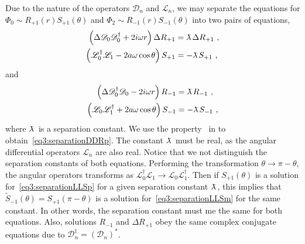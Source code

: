 Due to the nature of the operators $\mathscr{D}_n$ and $\mathscr{L}_n$, we may separate the equations for $\Phi_0 \sim R_{+1}(r) S_{+1}(\theta)$ and $\Phi_2 \sim R_{-1}(r) S_{-1}(\theta)$ into two pairs of equations, 
\begin{subequations}
    \label{eq3:separationRSp}
    \begin{align}
        \label{eq3:separationDDRp}
        \left(\Delta \mathscr{D}_0 \mathscr{D}^\dagger_0 + 2 i \omega r \right) \Delta R_{+1} 
        &= \lambdabar \Delta R_{+1} ~, \\
        \label{eq3:separationLLSp}
        \left( \mathscr{L}^\dagger_0 \mathscr{L}_1 - 2 a \omega \cos\theta \right) S_{+1}
        &= - \lambdabar S_{+1}  ~, 
    \end{align}
\end{subequations}
and
\begin{subequations}
    \label{eq3:separationRSm}
    \begin{align}
        \label{eq3:separationDDRm}
        \left( \Delta \mathscr{D}^\dagger_0 \mathscr{D}_0 - 2 i \omega r \right) R_{-1}
        &= \lambdabar R_{-1} ~, \\
        \label{eq3:separationLLSm}
        \left( \mathscr{L}_0 \mathscr{L}^\dagger_1 + 2 a \omega \cos\theta \right) S_{-1}
        &= - \lambdabar S_{-1}  ~,
    \end{align}
\end{subequations}
where $\lambdabar$ is a separation constant.
We use the property~ in to obtain~\eqref{eq3:separationDDRp}.
The constant $\lambdabar$ must be real, as the angular differential operators $\mathscr{L}_n$ are also real.
Notice that we not distinguish the separation constants of both equations. Performing the transformation $\theta \rightarrow \pi-\theta$, the angular operators transforms as $\mathscr{L}^\dagger_0 \mathscr{L}_1 \rightarrow \mathscr{L}_0 \mathscr{L}^\dagger_1$. Then if $S_{+1}(\theta)$ is a solution for~\eqref{eq3:separationLLSp} for a given separation constant $\lambdabar$, this implies that $\tilde{S}_{-1}(\theta)=S_{+1}(\pi-\theta)$ is a solution for~\eqref{eq3:separationLLSm} for the same constant. 
In other words, the separation constant must me the same for both equations. 
Also, solutions $R_{-1}$ and $\Delta R_{+1}$ obey the same complex conjugate equations due to $\mathscr{D}^\dagger_n=(\mathscr{D}_n)^*$.

